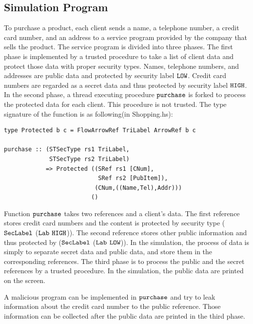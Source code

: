 \documentclass[a4paper]{report}
\newcommand{\co}[1]{$\cod{#1}$}
\begin{document}
\subsection{Simulation Program}
To purchase a product, each client sends a name, a telephone number, a credit card number, and an address to
a service program provided by the company that sells the product. The service program is divided into
three phases. The first phase is implemented by a trusted procedure to take a list of client data and
protect those data with proper security types. 
Names, telephone numbers, and addresses are public data and protected by security label \co{LOW}. 
Credit card numbers are regarded as a secret data and thus protected by security label \co{HIGH}. 
In the second phase, a thread executing procedure \co{purchase} is forked to
process the protected data for each client. This procedure is not trusted. 
The type signature of the function is as following(in Shopping.hs):
\begin{Verbatim}[fontsize=\footnotesize]
type Protected b c = FlowArrowRef TriLabel ArrowRef b c

purchase :: (STSecType rs1 TriLabel,
             STSecType rs2 TriLabel) 
            => Protected ((SRef rs1 [CNum], 
                           SRef rs2 [PubItem]),
                          (CNum,((Name,Tel),Addr)))
                         ()
\end{Verbatim}
Function \co{purchase} takes two references and a client's data. The first reference stores
credit card numbers and the content is protected by security type (\co{SecLabel} (\co{Lab} \co{HIGH})). 
The second reference stores other public information and thus protected by
(\co{SecLabel} (\co{Lab} \co{LOW})).
In the simulation, the process of data is simply to separate secret data and public data, 
and store them in the corresponding references.
The third phase is to process the public and the secret references by a trusted procedure.
In the simulation, the public data are printed on the screen.

A malicious program can be implemented in \co{purchase} and try to leak information about the credit card 
number to the public reference. Those information can be collected after the public data are printed in the 
third phase. 
\end{document}
